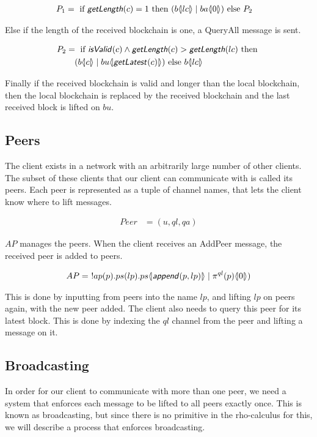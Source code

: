 \begin{align*}
	P_1 &=\text{ if }\text{\sffamily \textit{getLength}\normalfont}(c)=1\text{ then }(b \langle \! | lc | \! \rangle \mid ba \langle \! | 0 | \! \rangle)\text{ else }P_2
\end{align*}

Else if the length of the received blockchain is one, a QueryAll message is sent.

\begin{align*}
	P_2 &=\text{ if }\text{\sffamily \textit{isValid}\normalfont}(c) \land \text{\sffamily \textit{getLength}\normalfont}(c) > \text{\sffamily \textit{getLength}\normalfont}(lc)\text{ then }\\
	&\quad(b \langle \! | c | \! \rangle \mid bu \langle \! | \text{\sffamily \textit{getLatest}\normalfont}(c) | \! \rangle)\text{ else }b \langle \! | lc | \! \rangle
\end{align*}

Finally if the received blockchain is valid and longer than the local blockchain, then the local blockchain is replaced by the received blockchain and the last received block is lifted on $bu$.

\subsection{Peers}
The client exists in a network with an arbitrarily large number of other clients.
The subset of these clients that our client can communicate with is called its peers.
Each peer is represented as a tuple of channel names, that lets the client know where to lift messages.

\begin{align*}
    Peer &= (u, ql, qa)
\end{align*}

$AP$ manages the peers.
When the client receives an AddPeer message, the received peer is added to peers.

\begin{align*}
    AP &=\ !ap(p). ps(lp). ps \langle \! | \text{\sffamily \textit{append}\normalfont}(p,lp) | \! \rangle \mid  \pi^{ql}(p) \langle \! | 0 | \! \rangle)\\
\end{align*}

This is done by inputting from peers into the name $lp$, and lifting $lp$ on peers again, with the new peer added.
The client also needs to query this peer for its latest block.
This is done by indexing the $ql$ channel from the peer and lifting a message on it.

\subsection{Broadcasting} \label{broadcast}
In order for our client to communicate with more than one peer, we need a system that enforces each message to be lifted to all peers exactly once.
This is known as broadcasting, but since there is no primitive in the rho-calculus for this, we will describe a process that enforces broadcasting.

